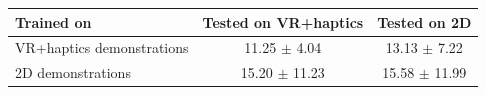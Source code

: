 \begin{tabular}{lcc}
\toprule
\textbf{Trained on} & \textbf{Tested on VR+haptics} & \textbf{Tested on 2D} \\
\midrule
VR+haptics demonstrations & 11.25 $\pm$ 4.04 & 13.13 $\pm$ 7.22 \\
2D demonstrations & 15.20 $\pm$ 11.23 & 15.58 $\pm$ 11.99 \\
\bottomrule
\end{tabular}
